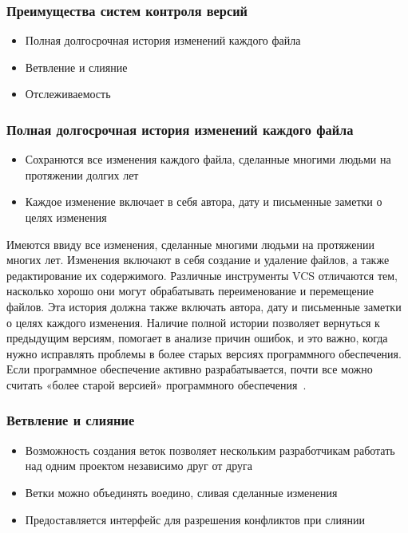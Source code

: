 \documentclass{../industrial-development}
\begin{document}
\begin{frame} \frametitle{Преимущества систем контроля версий}

  \begin{itemize}
  \item Полная долгосрочная история изменений каждого файла
  \item Ветвление и слияние
  \item Отслеживаемость
  \end{itemize}
\end{frame}

\begin{frame} \frametitle{Полная долгосрочная история изменений каждого файла}

  \begin{itemize}
  \item Сохранются все изменения каждого файла, сделанные многими людьми на протяжении долгих лет
  \item Каждое изменение включает в себя автора, дату и письменные заметки о целях изменения
  \end{itemize}
\end{frame}

\lecturenotes

Имеются ввиду все изменения, сделанные многими людьми на протяжении многих лет. Изменения включают в себя создание и удаление файлов, а также редактирование их содержимого. Различные инструменты VCS отличаются тем, насколько хорошо они могут обрабатывать переименование и перемещение файлов. Эта история должна также включать автора, дату и письменные заметки о целях каждого изменения. Наличие полной истории позволяет вернуться к предыдущим версиям, помогает в анализе причин ошибок, и это важно, когда нужно исправлять проблемы в более старых версиях программного обеспечения. Если программное обеспечение активно разрабатывается, почти все можно считать «более старой версией» программного обеспечения~\cite{Atlassian}.

\begin{frame} \frametitle{Ветвление и слияние}
  
  \begin{itemize}
  \item Возможность создания веток позволяет нескольким разработчикам работать над одним проектом независимо друг от друга
  \item Ветки можно объединять воедино, сливая сделанные изменения
  \item Предоставляется интерфейс для разрешения конфликтов при слиянии
  \end{itemize}
\end{frame}
\end{document}
